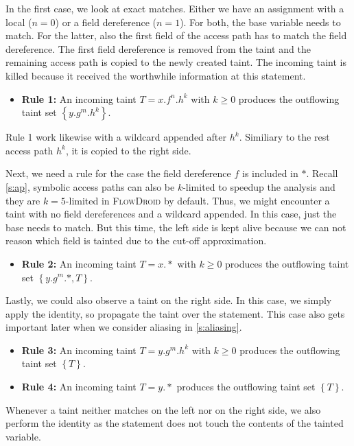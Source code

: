 \documentclass[../draft.tex]{subfiles}
\begin{document}
    In the first case, we look at exact matches. Either we have an assignment with a local ($n=0$) or a field dereference ($n=1$). For both, the base variable needs to match. For the latter, also the first field of the access path has to match the field dereference.
    The first field dereference is removed from the taint and the remaining access path is copied to the newly created taint. The incoming taint is killed because it received the worthwhile information at this statement.
    \begin{itemize}
        \item[] \textbf{Rule 1:} An incoming taint $T = x.f^n.h^k$ with $k \geq 0$ produces the outflowing taint set $\left\{y.g^m.h^k\right\}$.
    \end{itemize} 
    Rule 1 work likewise with a wildcard appended after $h^k$. Similiary to the rest access path $h^k$, it is copied to the right side.

    Next, we need a rule for the case the field dereference $f$ is included in $*$. Recall \autoref{s:ap}, symbolic access paths can also be $k$-limited to speedup the analysis and they are $k=5$-limited in \textsc{FlowDroid} by default. Thus, we might encounter a taint with no field dereferences and a wildcard appended. In this case, just the base needs to match. But this time, the left side is kept alive because we can not reason which field is tainted due to the cut-off approximation.
    \begin{itemize}
        \item[] \textbf{Rule 2:} An incoming taint $T = x.*$ with $k \geq 0$ produces the outflowing taint set $\left\{y.g^m.*, T\right\}$.
    \end{itemize} 

    Lastly, we could also observe a taint on the right side. In this case, we simply apply the identity, so propagate the taint over the statement. This case also gets important later when we consider aliasing in \autoref{s:aliasing}.
    \begin{itemize}
        \item[] \textbf{Rule 3:} An incoming taint $T = y.g^m.h^k$ with $k \geq 0$ produces the outflowing taint set $\left\{T\right\}$.
        \item[] \textbf{Rule 4:} An incoming taint $T = y.*$ produces the outflowing taint set $\left\{T\right\}$.
    \end{itemize}

    Whenever a taint neither matches on the left nor on the right side, we also perform the identity as the statement does not touch the contents of the tainted variable.  
\end{document}
